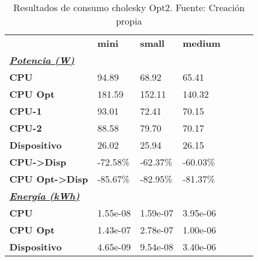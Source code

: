 \begin{table}[H]
    \centering
    \begin{tabular}{lllllll}
    \rowcolor[HTML]{DAE8FC} \ & \textbf{mini} & \textbf{	small} & \textbf{	medium} \\
    \cellcolor[HTML]{DAE8FC} \textbf{\textbf{{\emph{{\underline{{Potencia (W)}}}}}}} &  & 	 & 	 \\
    \rowcolor[HTML]{EFEFEF} \cellcolor[HTML]{DAE8FC} \textbf{CPU} & 94.89 & 	68.92 & 	65.41 \\
    \cellcolor[HTML]{DAE8FC} \textbf{CPU Opt} & 181.59 & 	152.11 & 	140.32 \\
    \rowcolor[HTML]{EFEFEF} \cellcolor[HTML]{DAE8FC} \textbf{\quad CPU-1} & 93.01 & 	72.41 & 	70.15 \\
    \cellcolor[HTML]{DAE8FC} \textbf{\quad CPU-2} & 88.58 & 	79.70 & 	70.17 \\
    \rowcolor[HTML]{EFEFEF} \cellcolor[HTML]{DAE8FC} \textbf{Dispositivo} & 26.02 & 	25.94 & 	26.15 \\
    \cellcolor[HTML]{DAE8FC} \textbf{CPU->Disp} & -72.58\% & 	-62.37\% & 	-60.03\% \\
    \rowcolor[HTML]{EFEFEF} \cellcolor[HTML]{DAE8FC} \textbf{CPU Opt->Disp} & -85.67\% & 	-82.95\% & 	-81.37\% \\
    \cellcolor[HTML]{DAE8FC} \textbf{\textbf{{\emph{{\underline{{Energía (kWh)}}}}}}} &  & 	 & 	 \\
    \rowcolor[HTML]{EFEFEF} \cellcolor[HTML]{DAE8FC} \textbf{CPU} & 1.55e-08 & 	1.59e-07 & 	3.95e-06 \\
    \cellcolor[HTML]{DAE8FC} \textbf{CPU Opt} & 1.43e-07 & 	2.78e-07 & 	1.00e-06 \\
    \rowcolor[HTML]{EFEFEF} \cellcolor[HTML]{DAE8FC} \textbf{Dispositivo} & 4.65e-09 & 	9.54e-08 & 	3.40e-06 \\
    \end{tabular}
    \caption[Resultados de consumo cholesky Opt2]{{Resultados de consumo cholesky Opt2. Fuente: Creación propia}}
    \label{table_test_cholesky_Opt2_hw_powerResults}
\end{table}